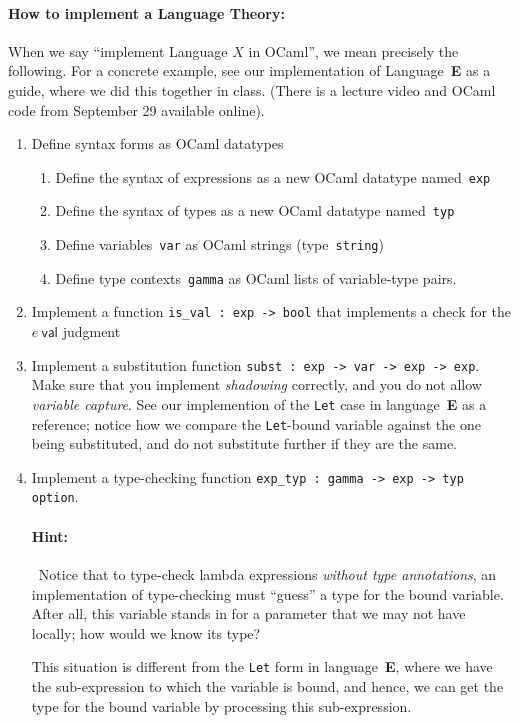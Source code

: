 \documentclass[11pt]{article}
\newcommand{\E}{\textbf{\textsf{E}}\xspace}
\begin{document}
\paragraph{How to implement a Language Theory:}
When we say ``implement Language $X$ in OCaml'', we mean precisely the
following.  For a concrete example, see our implementation of
Language~\E as a guide, where we did this together in class.  (There
is a lecture video and OCaml code from September 29 available online).
\begin{enumerate}
\item Define syntax forms as OCaml datatypes 
\begin{enumerate}
\item Define the syntax of expressions as a new OCaml datatype named~\texttt{exp}
\item Define the syntax of types as a new OCaml datatype named~\texttt{typ}
\item Define variables~\texttt{var} as OCaml strings (type~\texttt{string})
\item Define type contexts~\texttt{gamma} as OCaml lists of variable-type pairs.
\end{enumerate}
\item Implement a function \texttt{is\_val : exp -> bool} that implements a check for the $e~\textsf{val}$ judgment
\item Implement a substitution function \texttt{subst : exp -> var -> exp -> exp}.  
{
Make sure that you implement \emph{shadowing} correctly, and you do
not allow \emph{variable capture}.  
%
See our implemention of the \texttt{Let} case in language~\E
as a reference; notice how we compare the \texttt{Let}-bound variable
against the one being substituted, and do not substitute further if
they are the same.  }
\item Implement a type-checking function \texttt{exp\_typ : gamma ->
  exp -> typ option}.  

  \paragraph{Hint:}~Notice that to type-check lambda expressions \emph{without type
  annotations}, an implementation of type-checking must ``guess'' a
  type for the bound variable.  After all, this variable stands in for
  a parameter that we may not have locally; how would we know its type?

  This situation is different from the \texttt{Let} form in
  language~\E, where we have the sub-expression to which the
  variable is bound, and hence, we can get the type for the bound
  variable by processing this sub-expression.
  

\end{enumerate}
\end{document}
